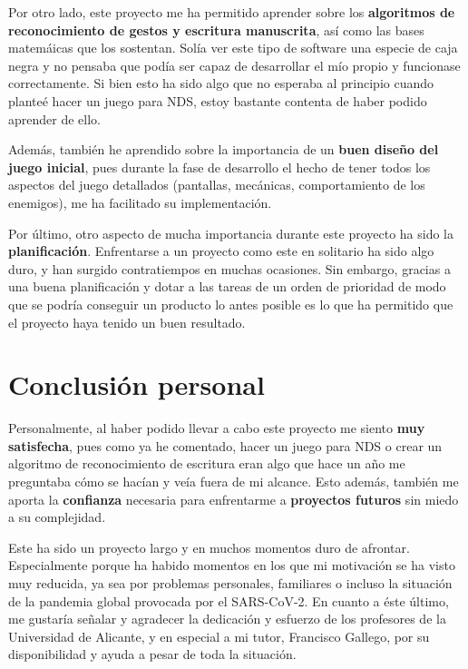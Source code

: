 \vspace{0.5cm}

Por otro lado, este proyecto me ha permitido aprender sobre los \textbf{algoritmos de reconocimiento de gestos y escritura manuscrita}, así como las bases matemáicas que los sostentan. Solía ver este tipo de software una especie de caja negra y no pensaba que podía ser capaz de desarrollar el mío propio y funcionase correctamente. Si bien esto ha sido algo que no esperaba al principio cuando planteé hacer un juego para NDS, estoy bastante contenta de haber podido aprender de ello.

\vspace{0.5cm}

Además, también he aprendido sobre la importancia de un \textbf{buen diseño del juego inicial}, pues durante la fase de desarrollo el hecho de tener todos los aspectos del juego detallados (pantallas, mecánicas, comportamiento de los enemigos), me ha facilitado su implementación.

\vspace{0.5cm}

Por último, otro aspecto de mucha importancia durante este proyecto ha sido la \textbf{planificación}. Enfrentarse a un proyecto como este en solitario ha sido algo duro, y han surgido contratiempos en muchas ocasiones. Sin embargo, gracias a una buena planificación y dotar a las tareas de un orden de prioridad de modo que se podría conseguir un producto lo antes posible es lo que ha permitido que el proyecto haya tenido un buen resultado.

\vspace{0.5cm}

\section{Conclusión personal}

Personalmente, al haber podido llevar a cabo este proyecto me siento \textbf{muy satisfecha}, pues como ya he comentado, hacer un juego para NDS o crear un algoritmo de reconocimiento de escritura eran algo que hace un año me preguntaba cómo se hacían y veía fuera de mi alcance. Esto además, también me aporta la \textbf{confianza} necesaria para enfrentarme a \textbf{proyectos futuros} sin miedo a su complejidad.

\vspace{0.5cm}

Este ha sido un proyecto largo y en muchos momentos duro de afrontar. Especialmente porque ha habido momentos en los que mi motivación se ha visto muy reducida, ya sea por problemas personales, familiares o incluso la situación de la pandemia global provocada por el SARS-CoV-2. En cuanto a éste último, me gustaría señalar y agradecer la dedicación y esfuerzo de los profesores de la Universidad de Alicante, y en especial a mi tutor, Francisco Gallego, por su disponibilidad y ayuda a pesar de toda la situación.

